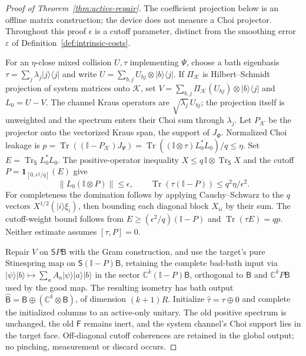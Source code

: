 \documentclass[11pt,a4paper]{article}
\numberwithin{equation}{section}
\theoremstyle{plain}
\theoremstyle{definition}
\DeclareMathOperator{\Tr}{Tr}
\newcommand{\rg}[1]{\mathsf{#1}}
\newcommand{\one}{\mathbb{I}}
\newcommand{\CC}{\mathbb{C}}
\newcommand{\ket}[1]{\lvert #1 \rangle}
\newcommand{\ketbra}[2]{\lvert #1 \rangle\langle #2 \rvert}
\begin{document}
\begin{proof}[Proof of Theorem~\ref{thm:active-repair}]
The coefficient projection below is an offline matrix construction; the device
does not measure a Choi projector. Throughout this proof $\epsilon$ is a
cutoff parameter, distinct from the smoothing error $\varepsilon$ of
Definition~\ref{def:intrinsic-costs}.

For an $\eta$-close mixed collision $U,\tau$ implementing $\Psi$, choose a
bath eigenbasis $\tau=\sum_j\lambda_j\ketbra{j}{j}$ and write
$U=\sum_{b,j}U_{bj}\otimes\ketbra{b}{j}$. If $\Pi_{\mathcal{K}}$ is
Hilbert--Schmidt projection of system matrices onto $\mathcal{K}$, set
$V=\sum_{b,j}\Pi_{\mathcal{K}}(U_{bj})\otimes\ketbra{b}{j}$ and $L_0=U-V$. The
channel Kraus operators are $\sqrt{\lambda_j}\,U_{bj}$; the projection itself
is unweighted and the spectrum enters their Choi sum through $\lambda_j$. Let
$P_{\mathcal{K}}$ be the projector onto the vectorized Kraus span, the support
of $J_\Phi$. Normalized Choi leakage is
$p=\Tr((\one-P_{\mathcal{K}})J_\Psi)=\Tr((\one\otimes\tau)L_0^*L_0)/q\le\eta$.
Set $E=\Tr_{\rg{S}}L_0^*L_0$. The positive-operator inequality
$X\le q\,\one\otimes\Tr_{\rg{S}}X$ and the cutoff
$P=\mathbf{1}_{[0,\epsilon^2/q]}(E)$ give
\begin{equation}
\label{eq:cutoff}
\lVert L_0(\one\otimes P)\rVert\le\epsilon,\qquad
\Tr(\tau(\one-P))\le q^2\eta/\epsilon^2 .
\end{equation}
For completeness the domination follows by applying Cauchy--Schwarz to the $q$
vectors $X^{1/2}(\ket{i}\xi_i)$, then bounding each diagonal block $X_{ii}$ by
their sum. The cutoff-weight bound follows from
$E\ge(\epsilon^2/q)(\one-P)$ and $\Tr(\tau E)=qp$. Neither estimate assumes
$[\tau,P]=0$.

Repair $V$ on $\rg{S}P\rg{B}$ with the Gram construction, and use the target's
pure Stinespring map on $\rg{S}(\one-P)\rg{B}$, retaining the complete bad-bath
input via $\ket{\psi}\ket{b}\mapsto\sum_a A_a\ket{\psi}\ket{a}\ket{b}$ in the
sector $\CC^k(\one-P)\rg{B}$, orthogonal to $\rg{B}$ and $\CC^k P\rg{B}$ used
by the good map. The resulting isometry has bath output
$\hat{\rg{B}}=\rg{B}\oplus(\CC^k\otimes\rg{B})$, of dimension $(k+1)R$.
Initialize $\hat\tau=\tau\oplus 0$ and complete the initialized columns to an
active-only unitary. The old positive spectrum is unchanged, the old $\rg{F}$
remains inert, and the system channel's Choi support lies in the target face.
Off-diagonal cutoff coherences are retained in the global output; no pinching,
measurement or discard occurs.


\end{proof}
\end{document}
